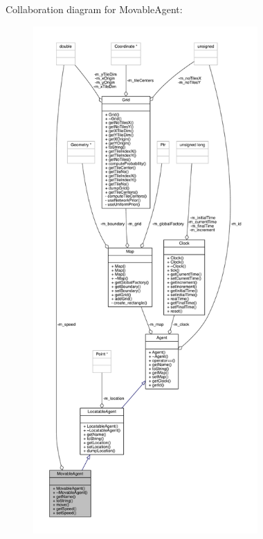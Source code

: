 Collaboration diagram for Movable\+Agent\+:\nopagebreak
\begin{figure}[H]
\begin{center}
\leavevmode
\includegraphics[height=550pt]{class_movable_agent__coll__graph}
\end{center}
\end{figure}

